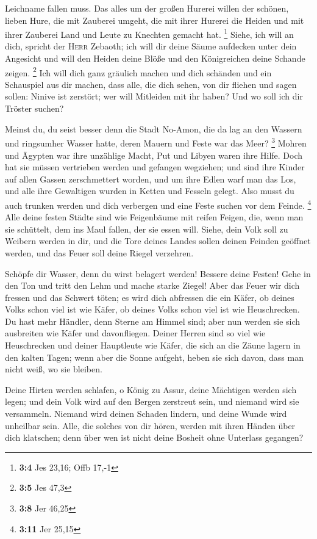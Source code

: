 Leichname fallen muss.  Das alles um der großen Hurerei
willen der schönen, lieben Hure, die mit Zauberei umgeht, die mit ihrer
Hurerei die Heiden und mit ihrer Zauberei Land und Leute zu Knechten
gemacht hat. \footnote{\textbf{3:4} Jes 23,16; Offb 17,-1}
 Siehe, ich will an dich, spricht der \textsc{Herr}
Zebaoth; ich will dir deine Säume aufdecken unter dein Angesicht und
will den Heiden deine Blöße und den Königreichen deine Schande zeigen.
\footnote{\textbf{3:5} Jes 47,3}  Ich will dich ganz
gräulich machen und dich schänden und ein Schauspiel aus dir machen,
 dass alle, die dich sehen, von dir fliehen und sagen
sollen: Ninive ist zerstört; wer will Mitleiden mit ihr haben? Und wo
soll ich dir Tröster suchen?

 Meinst du, du seist besser denn die Stadt No-Amon, die da
lag an den Wassern und ringsumher Wasser hatte, deren Mauern und Feste
war das Meer? \footnote{\textbf{3:8} Jer 46,25}  Mohren
und Ägypten war ihre unzählige Macht, Put und Libyen waren ihre Hilfe.
 Doch hat sie müssen vertrieben werden und gefangen
wegziehen; und sind ihre Kinder auf allen Gassen zerschmettert worden,
und um ihre Edlen warf man das Los, und alle ihre Gewaltigen wurden in
Ketten und Fesseln gelegt.  Also musst du auch trunken
werden und dich verbergen und eine Feste suchen vor dem Feinde.
\footnote{\textbf{3:11} Jer 25,15}  Alle deine festen
Städte sind wie Feigenbäume mit reifen Feigen, die, wenn man sie
schüttelt, dem ins Maul fallen, der sie essen will. 
Siehe, dein Volk soll zu Weibern werden in dir, und die Tore deines
Landes sollen deinen Feinden geöffnet werden, und das Feuer soll deine
Riegel verzehren.

 Schöpfe dir Wasser, denn du wirst belagert werden!
Bessere deine Festen! Gehe in den Ton und tritt den Lehm und mache
starke Ziegel!  Aber das Feuer wir dich fressen und das
Schwert töten; es wird dich abfressen die ein Käfer, ob deines Volks
schon viel ist wie Käfer, ob deines Volks schon viel ist wie
Heuschrecken.  Du hast mehr Händler, denn Sterne am
Himmel sind; aber nun werden sie sich ausbreiten wie Käfer und
davonfliegen.  Deiner Herren sind so viel wie
Heuschrecken und deiner Hauptleute wie Käfer, die sich an die Zäune
lagern in den kalten Tagen; wenn aber die Sonne aufgeht, heben sie sich
davon, dass man nicht weiß, wo sie bleiben.

 Deine Hirten werden schlafen, o König zu Assur, deine
Mächtigen werden sich legen; und dein Volk wird auf den Bergen zerstreut
sein, und niemand wird sie versammeln.  Niemand wird
deinen Schaden lindern, und deine Wunde wird unheilbar sein. Alle, die
solches von dir hören, werden mit ihren Händen über dich klatschen; denn
über wen ist nicht deine Bosheit ohne Unterlass gegangen?
